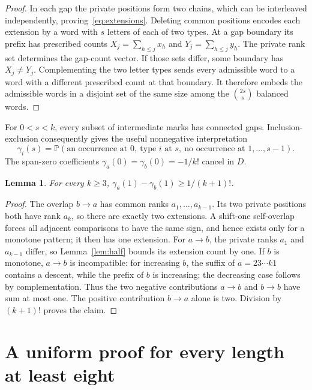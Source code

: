 \documentclass[11pt]{amsart}
\newtheorem{lemma}[theorem]{Lemma}
\theoremstyle{remark}
\newcommand{\Prb}{\mathbb P}
\begin{document}
\begin{proof}
In each gap the private positions form two chains, which can be interleaved independently, proving~\eqref{eq:extensions}. Deleting common positions encodes each extension by a word with $s$ letters of each of two types. At a gap boundary its prefix has prescribed counts $X_j=\sum_{h\le j}x_h$ and $Y_j=\sum_{h\le j}y_h$. The private rank set determines the gap-count vector. If those sets differ, some boundary has $X_j\ne Y_j$. Complementing the two letter types sends every admissible word to a word with a different prescribed count at that boundary. It therefore embeds the admissible words in a disjoint set of the same size among the $\binom{2s}{s}$ balanced words.
\end{proof}

For $0<s<k$, every subset of intermediate marks has connected gaps. Inclusion-exclusion consequently gives the useful nonnegative interpretation
\begin{equation}\label{eq:shortspan}
 \gamma_i(s)=\Prb(\text{an occurrence at }0,\ \text{type }i\text{ at }s,
       \ \text{no occurrence at }1,\ldots,s-1).
\end{equation}
The span-zero coefficients $\gamma_a(0)=\gamma_b(0)=-1/k!$ cancel in $D$.

\begin{lemma}\label{lem:one}
For every $k\ge3$, $\gamma_a(1)-\gamma_b(1)\ge1/(k+1)!$.
\end{lemma}

\begin{proof}
The overlap $b\to a$ has common ranks $a_1,\ldots,a_{k-1}$. Its two private positions both have rank $a_k$, so there are exactly two extensions. A shift-one self-overlap forces all adjacent comparisons to have the same sign, and hence exists only for a monotone pattern; it then has one extension. For $a\to b$, the private ranks $a_1$ and $a_{k-1}$ differ, so Lemma~\ref{lem:half} bounds its extension count by one. If $b$ is monotone, $a\to b$ is incompatible: for increasing $b$, the suffix of $a=23\cdots k1$ contains a descent, while the prefix of $b$ is increasing; the decreasing case follows by complementation. Thus the two negative contributions $a\to b$ and $b\to b$ have sum at most one. The positive contribution $b\to a$ alone is two. Division by $(k+1)!$ proves the claim.
\end{proof}

\section{A uniform proof for every length at least eight}
\end{document}
